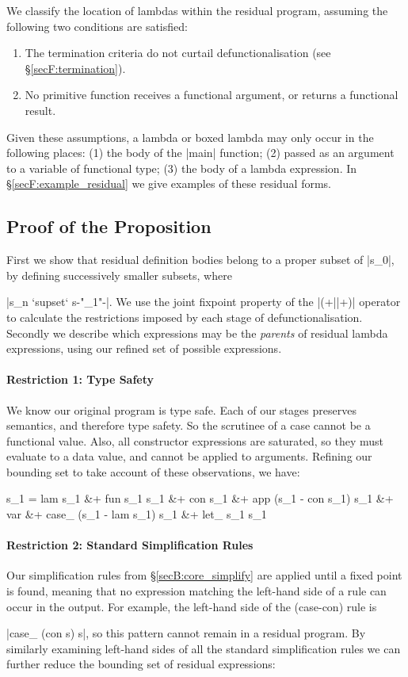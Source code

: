 We classify the location of lambdas within the residual program, assuming the following two conditions are satisfied:

\begin{enumerate}
\item The termination criteria do not curtail defunctionalisation (see \S\ref{secF:termination}).
\item No primitive function receives a functional argument, or returns a functional result.
\end{enumerate}

Given these assumptions, a lambda or boxed lambda may only occur in the following places: (1) the body of the |main| function; (2) passed as an argument to a variable of functional type; (3) the body of a lambda expression. In \S\ref{secF:example_residual} we give examples of these residual forms.

\subsection{Proof of the Proposition}

First we show that residual definition bodies belong to a proper subset of |s_0|, by defining successively smaller subsets, where \ignore|s_n `supset` s{-"_{\text{\tiny{+}}1}"-}|. We use the joint fixpoint property of the |(+||+)| operator to calculate the restrictions imposed by each stage of defunctionalisation. Secondly we describe which expressions may be the \textit{parents} of residual lambda expressions, using our refined set of possible expressions.

\paragraph{Restriction 1: Type Safety}
We know our original program is type safe. Each of our stages preserves semantics, and therefore type safety. So the scrutinee of a case cannot be a functional value. Also, all constructor expressions are saturated, so they must evaluate to a data value, and cannot be applied to arguments. Refining our bounding set to take account of these observations, we have:

\ignore\begin{code}
s_1  =  lam s_1 &+ fun s_1 s_1 &+ con s_1 &+ app (s_1 - con s_1) s_1 &+ var &+
        case_ (s_1 - lam s_1) s_1 &+ let_ s_1 s_1
\end{code}

\paragraph{Restriction 2: Standard Simplification Rules}
Our simplification rules from \S\ref{secB:core_simplify} are applied until a fixed point is found, meaning that no expression matching the left-hand side of a rule can occur in the output. For example, the left-hand side of the (case-con) rule is \ignore|case_ (con s) s|, so this pattern cannot remain in a residual program. By similarly examining left-hand sides of all the standard simplification rules we can further reduce the bounding set of residual expressions:

